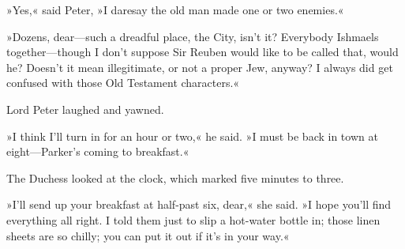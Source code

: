 »Yes,« said Peter, »I daresay the old man made one or two enemies.«

»Dozens, dear\allowbreak---\allowbreak such a dreadful place, the City, isn't it? Everybody Ishmaels together\allowbreak---\allowbreak though I don't suppose Sir Reuben would like to be called that, would he? Doesn't it mean illegitimate, or not a proper Jew, anyway? I always did get confused with those Old Testament characters.«

Lord Peter laughed and yawned.

»I think I'll turn in for an hour or two,« he said. »I must be back in town at eight\allowbreak---\allowbreak Parker's coming to breakfast.«

The Duchess looked at the clock, which marked five minutes to three.

»I'll send up your breakfast at half-past six, dear,« she said. »I hope you'll find everything all right. I told them just to slip a hot-water bottle in; those linen sheets are so chilly; you can put it out if it's in your way.«
